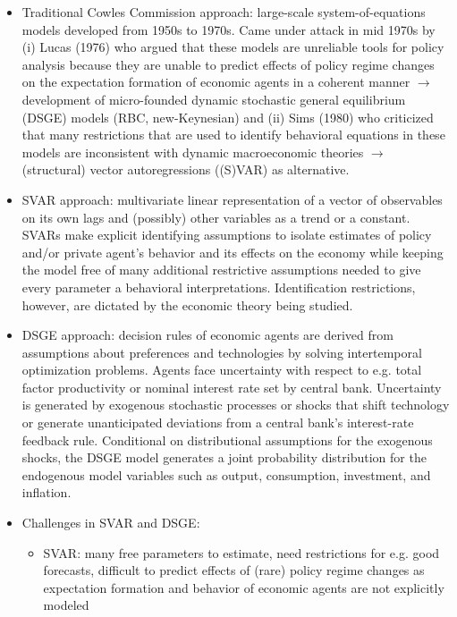 \begin{solution}
\begin{itemize}
        \item Traditional Cowles Commission approach: large-scale system-of-equations models developed from 1950s to 1970s. Came under attack in mid 1970s by (i) Lucas (1976) who argued that these models are unreliable tools for policy analysis because they are unable to predict effects of policy regime changes on the expectation formation of economic agents in a coherent manner $\rightarrow$ development of micro-founded dynamic stochastic general equilibrium (DSGE) models (RBC, new-Keynesian) and (ii) Sims (1980) who criticized that many restrictions that are used to identify behavioral equations in these models are inconsistent with dynamic macroeconomic theories $\rightarrow$ (structural) vector autoregressions ((S)VAR) as alternative.

        \item SVAR approach: multivariate linear representation of a vector of observables on its own lags and (possibly) other variables as a trend or a constant. SVARs make explicit identifying assumptions to isolate estimates of policy and/or private agent's behavior and its effects on the economy while keeping the model free of many additional restrictive assumptions needed to give every parameter a behavioral interpretations. Identification restrictions, however, are dictated by the economic theory being studied.

        \item DSGE approach: decision rules of economic agents are derived from assumptions about preferences and technologies by solving intertemporal optimization problems. Agents face uncertainty with respect to e.g. total factor productivity or nominal interest rate set by central bank. Uncertainty is generated by exogenous stochastic processes or shocks that shift technology or generate unanticipated deviations from a central bank's interest-rate feedback rule. Conditional on distributional assumptions for the exogenous shocks, the DSGE model generates a joint probability distribution for the endogenous model variables such as output, consumption, investment, and inflation.

        \item Challenges in SVAR and DSGE:
              \begin{itemize}
                  \item SVAR: many free parameters to estimate, need restrictions for e.g. good forecasts, difficult to predict effects of (rare) policy regime changes as expectation formation and behavior of economic agents are not explicitly modeled


\end{itemize}
\end{itemize}
\end{solution}
